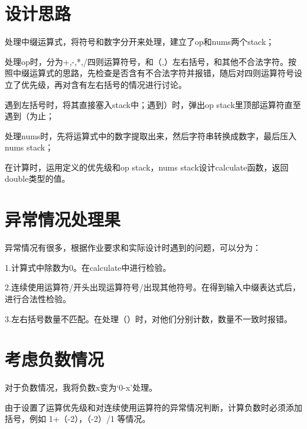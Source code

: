 \documentclass[UTF8]{ctexart}
\begin{document}
\pagestyle{fancy}
\fancyhead{}

\section{设计思路}
处理中缀运算式，将符号和数字分开来处理，建立了op和nums两个stack；

处理op时，分为+,-,*,/四则运算符号，和（,）左右括号，和其他不合法字符。按照中缀运算式的思路，先检查是否含有不合法字符并报错，随后对四则运算符号设立了优先级，再对含有左右括号的情况进行讨论。

遇到左括号时，将其直接塞入stack中；遇到）时，弹出op stack里顶部运算符直至遇到（为止；

处理nums时，先将运算式中的数字提取出来，然后字符串转换成数字，最后压入nums stack；

在计算时，运用定义的优先级和op stack，nums stack设计calculate函数，返回double类型的值。

\section{异常情况处理果}

异常情况有很多，根据作业要求和实际设计时遇到的问题，可以分为：

1.计算式中除数为0。在calculate中进行检验。


2.连续使用运算符/开头出现运算符号/出现其他符号。在得到输入中缀表达式后，进行合法性检验。


3.左右括号数量不匹配。在处理（）时，对他们分别计数，数量不一致时报错。


\section{考虑负数情况}
对于负数情况，我将负数x变为‘0-x’处理。

由于设置了运算优先级和对连续使用运算符的异常情况判断，计算负数时必须添加括号，例如 1+（-2），（-2）/1 等情况。
\end{document}
